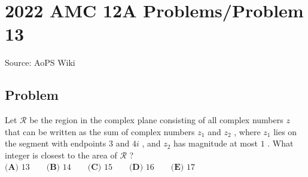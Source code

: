 \documentclass[12pt]{article}
\begin{document}
\section*{{2022 AMC 12A Problems/Problem 13}}
Source: AoPS Wiki

\subsection*{Problem}
Let $\mathcal{R}$ be the region in the complex plane consisting of all complex numbers $z$ that can be written as the sum of complex numbers $z_1$ and $z_2$ , where $z_1$ lies on the segment with endpoints $3$ and $4i$ , and $z_2$ has magnitude at most $1$ . What integer is closest to the area of $\mathcal{R}$ ? $\textbf{(A) } 13 \qquad \textbf{(B) } 14 \qquad \textbf{(C) } 15 \qquad \textbf{(D) } 16 \qquad \textbf{(E) } 17$
\end{document}
